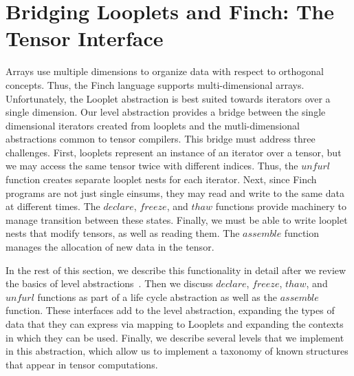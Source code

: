 \section{Bridging Looplets and Finch: The Tensor Interface}
%
%
%
%
Arrays use multiple dimensions to organize data with respect to orthogonal concepts.
%
Thus, the Finch language supports multi-dimensional arrays.
%
Unfortunately, the Looplet abstraction is best suited towards iterators over a single dimension.
%
Our level abstraction provides a bridge between the single dimensional iterators created from looplets and the mutli-dimensional abstractions common to tensor compilers.
% 
This bridge must address three challenges.
%
First, looplets represent an instance of an iterator over a tensor, but we may access the same tensor twice with different indices.
%
Thus, the $unfurl$ function creates separate looplet nests for each iterator.
%
Next, since Finch programs are not just single einsums, they may read and write to the same data at different times.
%
The $declare$, $freeze$, and $thaw$ functions provide machinery to manage transition between these states.
%
Finally, we must be able to write looplet nests that modify tensors, as well as reading them.
%
The $assemble$ function manages the allocation of new data in the tensor.


In the rest of this section, we describe this functionality in detail after we review the basics of level abstractions~\cite{sze2017efficient,chou2022compilation, chou2018format}.
%
Then we discuss $declare$, $freeze$, $thaw$, and $unfurl$ functions as part of a life cycle abstraction as well as the $assemble$ function.
%
These interfaces add to the level abstraction, expanding the types of data that they can express via mapping to Looplets and expanding the contexts in which they can be used.
%
Finally, we describe several levels that we implement in this abstraction, which allow us to implement a taxonomy of known structures that appear in tensor computations.



